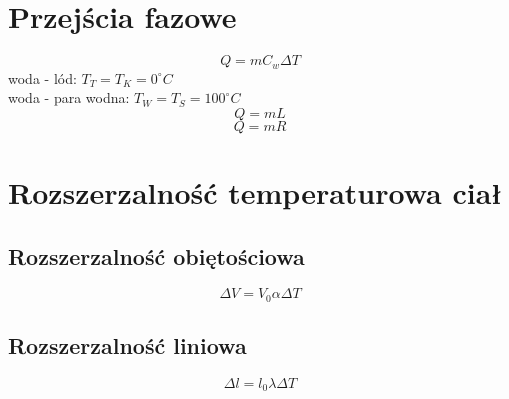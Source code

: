   \section{Przejścia fazowe}
    \begin{equation}
      Q = mC_w\Delta T
    \end{equation}
    woda - lód: $T_T = T_K = 0^\circ C$\\
    woda - para wodna: $T_W = T_S = 100^\circ C$
    \begin{equation}
      Q = mL
    \end{equation}
    \begin{equation}
      Q = mR
    \end{equation}
  \section{Rozszerzalność temperaturowa ciał}
    \subsection{Rozszerzalność obiętościowa}
      \begin{equation}
        \Delta V = V_0\alpha\Delta T
      \end{equation}
    \subsection{Rozszerzalność liniowa}
      \begin{equation}
        \Delta l = l_0\lambda\Delta T
      \end{equation}
